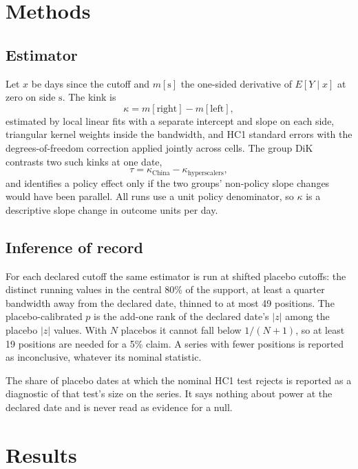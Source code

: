 \documentclass[11pt]{article}
\begin{document}
\section{Methods}\label{sec:methods}

\subsection{Estimator}

Let $x$ be days since the cutoff and $m[\mathrm{s}]$ the one-sided derivative of
$E[Y \mid x]$ at zero on side $\mathrm{s}$. The kink is
\begin{equation}
\kappa = m[\text{right}] - m[\text{left}],
\end{equation}
estimated by local linear fits with a separate intercept and slope on each side,
triangular kernel weights inside the bandwidth, and HC1 standard errors with the
degrees-of-freedom correction applied jointly across cells. The group DiK contrasts two
such kinks at one date,
\begin{equation}
\tau = \kappa_{\text{China}} - \kappa_{\text{hyperscalers}},
\end{equation}
and identifies a policy effect only if the two groups' non-policy slope changes would
have been parallel. All runs use a unit policy denominator, so $\kappa$ is a descriptive
slope change in outcome units per day.

\subsection{Inference of record}

For each declared cutoff the same estimator is run at shifted placebo cutoffs: the
distinct running values in the central 80\% of the support, at least a quarter
bandwidth away from the declared date, thinned to at most 49 positions. The
placebo-calibrated $p$ is the add-one rank of the declared date's $|z|$ among the
placebo $|z|$ values. With $N$ placebos it cannot fall below $1/(N+1)$, so at least 19
positions are needed for a 5\% claim. A series with fewer positions is reported as
inconclusive, whatever its nominal statistic.

The share of placebo dates at which the nominal HC1 test rejects is reported as a
diagnostic of that test's size on the series. It says nothing about power at the
declared date and is never read as evidence for a null.

\section{Results}\label{sec:results}
\end{document}
